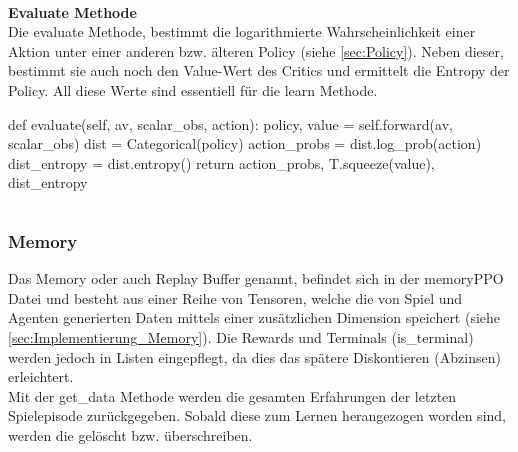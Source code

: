 \\\textbf{Evaluate Methode}\\
Die evaluate Methode, bestimmt die logarithmierte Wahrscheinlichkeit einer Aktion unter einer anderen bzw. älteren Policy (siehe \ref{sec:Policy}). Neben dieser, bestimmt sie auch noch den Value-Wert des Critics und ermittelt die Entropy der Policy. All diese Werte sind essentiell für die learn Methode.
\begin{python}
def evaluate(self, av, scalar_obs, action):
	policy, value = self.forward(av, scalar_obs)
	dist = Categorical(policy)
	action_probs = dist.log_prob(action)
	dist_entropy = dist.entropy()
	return action_probs, T.squeeze(value), dist_entropy
\end{python}
\begin{lstlisting}[caption=Darstellung der evaluate Methode, label=code:evaluate_Methode]
\end{lstlisting}

\subsubsection{Memory}
Das Memory oder auch Replay Buffer genannt, befindet sich in der memoryPPO Datei und
besteht aus einer Reihe von Tensoren, welche die von Spiel und Agenten generierten Daten mittels einer zusätzlichen Dimension speichert (siehe \ref{sec:Implementierung_Memory}). Die Rewards und Terminals (is\_terminal) werden jedoch in Listen eingepflegt, da dies das spätere Diskontieren (Abzinsen) erleichtert.\\
Mit der get\_data Methode werden die gesamten Erfahrungen der letzten Spielepisode zurückgegeben. Sobald diese zum Lernen herangezogen worden sind, werden die gelöscht bzw. überschreiben.

